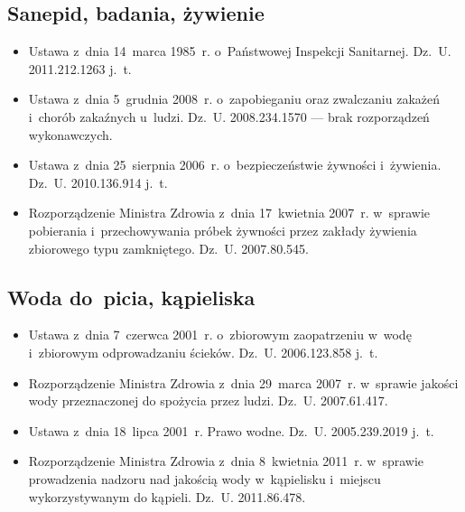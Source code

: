 \documentclass[a5paper,10pt,titlepage,twoside]{article}
\begin{document}
\subsection{Sanepid, badania, żywienie}
\begin{itemize}
\item Ustawa z~dnia 14~marca 1985~r. o~Państwowej Inspekcji Sanitarnej. Dz.~U. 2011.212.1263 j.~t.
\item Ustawa z~dnia 5~grudnia 2008~r. o~zapobieganiu oraz zwalczaniu zakażeń i~chorób zakaźnych u~ludzi. Dz.~U. 2008.234.1570 --- brak rozporządzeń wykonawczych.
\item Ustawa z~dnia 25~sierpnia 2006~r. o~bezpieczeństwie żywności i~żywienia. Dz.~U. 2010.136.914 j.~t.
\item Rozporządzenie Ministra Zdrowia z~dnia 17~kwietnia 2007~r. w~sprawie pobierania i~przechowywania próbek żywności przez zakłady żywienia zbiorowego typu zamkniętego. Dz.~U. 2007.80.545.
\end{itemize}

\subsection{Woda do~picia, kąpieliska}
\begin{itemize}
\item Ustawa z~dnia 7~czerwca 2001~r. o~zbiorowym zaopatrzeniu w~wodę i~zbiorowym odprowadzaniu ścieków. Dz.~U. 2006.123.858 j.~t.
\item Rozporządzenie Ministra Zdrowia z~dnia 29~marca 2007~r. w~sprawie jakości wody przeznaczonej do spożycia przez ludzi. Dz.~U. 2007.61.417.
\item Ustawa z~dnia 18~lipca 2001~r. Prawo wodne. Dz.~U. 2005.239.2019 j.~t.
\item Rozporządzenie Ministra Zdrowia z~dnia 8~kwietnia 2011~r. w~sprawie prowadzenia nadzoru nad jakością wody w~kąpielisku i~miejscu wykorzystywanym do kąpieli. Dz.~U. 2011.86.478.
\end{itemize}
\end{document}
